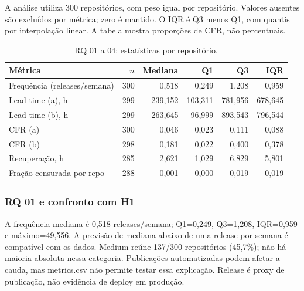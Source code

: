 
A análise utiliza 300 repositórios, com peso igual por repositório. Valores ausentes são excluídos por métrica; zero é mantido. O IQR é Q3 menos Q1, com quantis por interpolação linear. A tabela mostra proporções de CFR, não percentuais.



\begin{table}[ht]\centering\small

\caption{RQ 01 a 04: estatísticas por repositório.}\label{tab:rq0104-resumo}

\begin{tabular}{lrrrrr}\hline Métrica & $n$ & Mediana & Q1 & Q3 & IQR \\ \hline

Frequência (releases/semana) & 300 & 0,518 & 0,249 & 1,208 & 0,959 \\

Lead time (a), h & 299 & 239,152 & 103,311 & 781,956 & 678,645 \\

Lead time (b), h & 299 & 263,645 & 96,999 & 893,543 & 796,544 \\

CFR (a) & 300 & 0,046 & 0,023 & 0,111 & 0,088 \\

CFR (b) & 298 & 0,181 & 0,022 & 0,400 & 0,378 \\

Recuperação, h & 285 & 2,621 & 1,029 & 6,829 & 5,801 \\

Fração censurada por repo & 288 & 0,001 & 0,000 & 0,019 & 0,019 \\

\hline\end{tabular}\end{table}

\subsubsection{RQ 01 e confronto com H1} A frequência mediana é 0,518 releases/semana; Q1=0,249, Q3=1,208, IQR=0,959 e máximo=49,556. A previsão de mediana abaixo de uma release por semana é compatível com os dados. Medium reúne 137/300 repositórios (45,7\%); não há maioria absoluta nessa categoria. Publicações automatizadas podem afetar a cauda, mas metrics.csv não permite testar essa explicação. Release é proxy de publicação, não evidência de deploy em produção.



